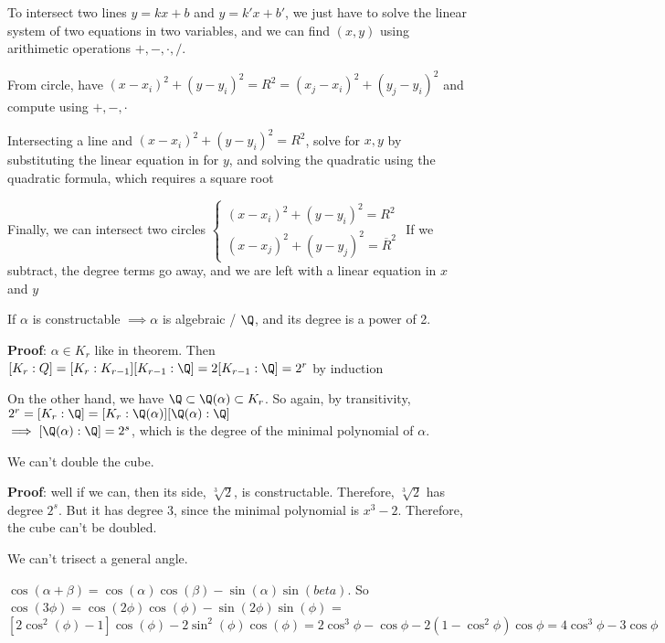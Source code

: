 \documentclass[twoside, 10pt]{article}
\begin{document}
To intersect two lines $y = kx + b$ and $y = k'x + b'$, we just have to solve the linear system of two equations in two variables, and we can find $(x, y)$ using arithimetic operations $+, -, \cdot, /$.

From circle, have $(x - x_i)^2 + (y - y_i)^2 = R^2 = (x_j - x_i)^2 + (y_j - y_i)^2$ and compute using $+, -, \cdot$

Intersecting a line and $(x - x_i)^2 + (y - y_i)^2 = R^2$, solve for $x, y$ by substituting the linear equation in for $y$, and solving the quadratic using the quadratic formula, which requires a square root

Finally, we can intersect two circles $\begin{cases}
    (x - x_i)^2 + (y - y_i)^2 = R^2\\
    (x - x_j)^2 + (y - y_j)^2 = \overline{R}^2
\end{cases}$
If we subtract, the degree terms go away, and we are left with a linear equation in $x$ and $y$
\begin{cor}
    If $\alpha$ is constructable $\implies \alpha$ is algebraic / $\Q$, and its degree is a power of 2.
\end{cor}
\textbf{Proof}: $\alpha \in K_r$ like in theorem. Then $[K_r : Q] = [K_r:K_{r-1}][K_{r-1}:\Q] = 2[K_{r-1}:\Q] = 2^r$ by induction

On the other hand, we have $\Q \subset \Q(\alpha) \subset K_r$. So again, by transitivity, $2^r = [K_r : \Q] = [K_r: \Q(\alpha)][\Q(\alpha) : \Q]$\\
$\implies [\Q(\alpha):\Q] = 2^s$, which is the degree of the minimal polynomial of $\alpha$.

\begin{cor}
    We can't double the cube.
\end{cor}
\textbf{Proof}: well if we can, then its side, $\sqrt[3]{2}$, is constructable. Therefore, $\sqrt[3]{2}$ has degree $2^s$. But it has degree 3, since the minimal polynomial is $x^3 - 2$. Therefore, the cube can't be doubled.

\begin{cor}
    We can't trisect a general angle.
\end{cor}
$\cos(\alpha + \beta) = \cos(\alpha)\cos(\beta) -\sin(\alpha)\sin(beta)$. So $\cos(3\phi) = \cos(2\phi)\cos(\phi) - \sin(2\phi)\sin(\phi)$ =\\ $[2\cos^2(\phi)-1]\cos(\phi) - 2\sin^2(\phi)\cos(\phi) = 2\cos^3\phi - \cos\phi - 2(1 - \cos^2\phi)\cos\phi = 4\cos^3\phi - 3\cos\phi$
\end{document}
